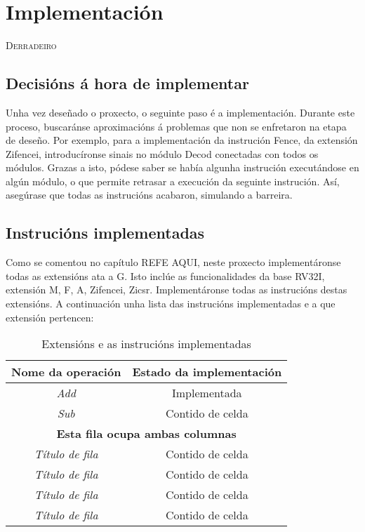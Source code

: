 \chapter{Implementación}
\label{chap:implementacion}

\lettrine{D}{erradeiro} 

\section{Decisións á hora de implementar}\label{sec:decisions}
Unha vez deseñado o proxecto, o seguinte paso é a implementación. Durante este proceso, buscaránse aproximacións á problemas que non se enfretaron na etapa de deseño. Por exemplo, para a implementación da instrución Fence, da extensión Zifencei, introducíronse sinais no módulo Decod conectadas con todos os módulos. Grazas a isto, pódese saber se había algunha instrución executándose en algún módulo, o que permite retrasar a execución da seguinte instrución. Así, asegúrase que todas as instrucións acabaron, simulando a barreira.


\section{Instrucións implementadas}\label{sec:intrucions_implt}
Como se comentou no capítulo REFE AQUI, neste proxecto implementáronse todas as extensións ata a G. Isto inclúe as funcionalidades da base RV32I, extensión M, F, A, Zifencei, Zicsr. Implementáronse todas as instrucións destas extensións. A continuación unha lista das instrucións implementadas e a que extensión pertencen:
\begin{table}[hp!]
  \centering
  \begin{tabular}{c|c}
    \rowcolor{udcpink!25}
    \textbf{Nome da operación} & \textbf{Estado da implementación} \\\hline
    \textit{Add} & Implementada \\
    \textit{Sub} & Contido de celda \\
    \multicolumn{2}{c}{\textbf{Esta fila ocupa ambas columnas}} \\
    \textit{Título de fila} & Contido de celda \\
    \textit{Título de fila} & Contido de celda \\
    \textit{Título de fila} & Contido de celda \\
    \textit{Título de fila} & Contido de celda \\
  \end{tabular}
  \caption{Extensións e as instrucións implementadas}
  \label{tab:intrucions_implementadas}
\end{table}


